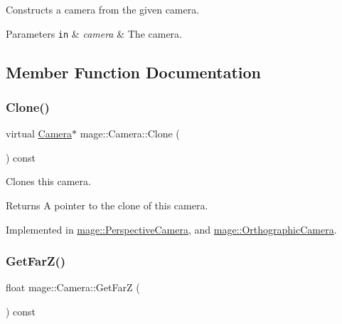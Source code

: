 Constructs a camera from the given camera.


\begin{DoxyParams}[1]{Parameters}
\mbox{\tt in}  & {\em camera} & The camera. \\
\hline
\end{DoxyParams}


\subsection{Member Function Documentation}
\hypertarget{classmage_1_1_camera_a19301c2256c183db50b5e9406f7b5f3c}{}\label{classmage_1_1_camera_a19301c2256c183db50b5e9406f7b5f3c} 
\subsubsection{\texorpdfstring{Clone()}{Clone()}}
{\footnotesize\ttfamily virtual \hyperlink{classmage_1_1_camera}{Camera}$\ast$ mage\+::\+Camera\+::\+Clone (\begin{DoxyParamCaption}{ }\end{DoxyParamCaption}) const\hspace{0.3cm}{\ttfamily [pure virtual]}}

Clones this camera.

\begin{DoxyReturn}{Returns}
A pointer to the clone of this camera. 
\end{DoxyReturn}


Implemented in \hyperlink{classmage_1_1_perspective_camera_aa2fae7b2ca5daadeda0fd935fcdb101a}{mage\+::\+Perspective\+Camera}, and \hyperlink{classmage_1_1_orthographic_camera_a3fc2e5cfe7283670937de2a4841a5428}{mage\+::\+Orthographic\+Camera}.

\hypertarget{classmage_1_1_camera_a7f293a8711086b3419fe3b4224ff2778}{}\label{classmage_1_1_camera_a7f293a8711086b3419fe3b4224ff2778} 
\subsubsection{\texorpdfstring{Get\+Far\+Z()}{GetFarZ()}}
{\footnotesize\ttfamily float mage\+::\+Camera\+::\+Get\+FarZ (\begin{DoxyParamCaption}{ }\end{DoxyParamCaption}) const}

